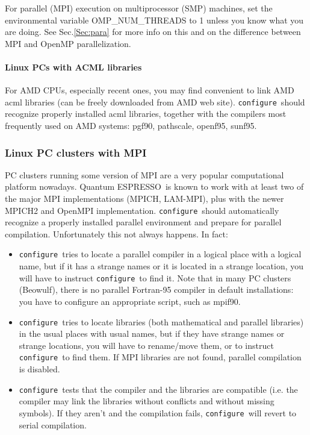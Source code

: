 \documentclass[12pt,a4paper]{article}
\def\qe{{\sc Quantum ESPRESSO}}
\def\configure{\texttt{configure}}
\begin{document}
For parallel (MPI) execution on multiprocessor (SMP) machines, set the
environmental variable OMP\_NUM\_THREADS to 1 unless you know what you 
are doing. See Sec.\ref{Sec:para} for more info on this
and on the difference between MPI and OpenMP parallelization. 

\paragraph{Linux PCs with ACML libraries}
For AMD CPUs, especially recent ones, you may find convenient to 
link AMD acml libraries (can be freely downloaded from AMD web site). 
\configure\ should recognize properly installed acml libraries,
together with the compilers most frequently used on AMD systems:
pgf90, pathscale, openf95, sunf95.

\subsubsection{Linux PC clusters with MPI}
\label{SubSec:LinuxPCMPI}
PC clusters running some version of MPI are a very popular
computational platform nowadays. \qe\ is known to work
with at least two of the major MPI implementations (MPICH, LAM-MPI),
plus with the newer MPICH2 and OpenMPI implementation. 
\configure\ should automatically recognize a properly installed
parallel environment and prepare for parallel compilation. 
Unfortunately this not always happens. In fact:
\begin{itemize}
\item \configure\ tries to locate a parallel compiler in a logical
  place with a logical name,  but if it has a strange names or it is
  located  in a strange location, you will have to instruct \configure\ 
  to find it. Note that in many PC clusters (Beowulf), there is no
  parallel Fortran-95 compiler in default installations:  you have to
  configure an appropriate script, such as mpif90. 
\item \configure\ tries to locate libraries (both mathematical and
  parallel libraries) in the usual places with usual names, but if
  they have strange names or strange locations, you will have to
  rename/move them, or to instruct \configure\ to find them. If MPI
  libraries are not found,
  parallel compilation is disabled. 
\item \configure\ tests that the compiler and the libraries are
  compatible (i.e. the compiler may link the libraries without
  conflicts and without missing symbols). If they aren't and the
  compilation fails, \configure\ will revert to serial compilation. 
\end{itemize}
\end{document}
